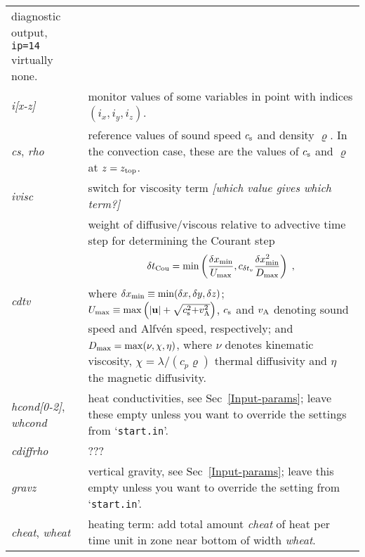 \documentclass[12pt,twoside,notitlepage,a4paper]{article}
\newcommand{\Note}[1]{\emph{[#1]}}
\newcommand{\code}[1]{\texttt{#1}}
\newcommand{\var}[1]{\textsl{#1}\index{#1}\/}
\newcommand{\file}[1]{`\texttt{#1}'}
\newcommand{\vekt}[1] {\mathbf{#1}}
\newcommand{\cs}            {c_{\rm s}}
\newcommand{\uv}            {\vekt{u}}
\newcommand{\vA}            {v_{\rm A}}
\begin{document}
\begin{longtable}{lp{}}
                 diagnostic output, \code{ip=14} virtually none. \\
  \var{i[x-z]} & monitor values of some variables in point with indices
                 $(i_x,i_y,i_z)$. \\
  \var{cs}, \var{rho}
               & reference values of sound speed $\cs$ and density
                 $\varrho$. In the convection case, these are the values of
                 $\cs$ and $\varrho$ at $z=z_{\rm top}$. \\
  \var{ivisc}  & switch for viscosity term
                 \Note{which value gives which term?} \\
  \var{cdtv}   & weight of diffusive/viscous relative to advective time
                 step for determining the Courant step
                 \begin{equation}
                   \delta t_{\rm Cou}
                   = \min\left( \frac{\delta x_{\rm min}}
                                     {U_{\rm max}} ,
                                c_{\delta t_v}
                                \frac{\delta x_{\rm min}^2}
                                     {D_{\rm max}}
                         \right) \; ,
                 \end{equation}
                 where
                 $\delta x_{\rm min} \equiv \min(\delta x, \delta y, \delta z)$;
                 $U_{\rm max} \equiv \max\left(|\uv|
                                     + \sqrt{\cs^2{+}\vA^2}\right)$,
                 $\cs$ and $\vA$ denoting sound speed and Alfv\'en speed,
                 respectively;
                 and $D_{\rm max} = \max(\nu,\chi,\eta)$, where
                 $\nu$ denotes kinematic viscosity,
                 $\chi = \lambda/(c_p\varrho)$ thermal diffusivity and
                 $\eta$ the magnetic diffusivity.
                 \\
  \var{hcond[0-2]}, \var{whcond}
               & heat conductivities, see Sec~\ref{Input-params}; leave
                 these empty unless you want to override the settings from
                 \file{start.in}. \\
  \var{cdiffrho}
               & ??? \\
  \var{gravz}  & vertical gravity, see Sec~\ref{Input-params}; leave
                 this empty unless you want to override the setting from
                 \file{start.in}. \\
  \var{cheat}, \var{wheat}
               & heating term: add total amount \var{cheat} of heat per
                 time unit in zone near bottom of width \var{wheat}.

\end{longtable}
\end{document}
